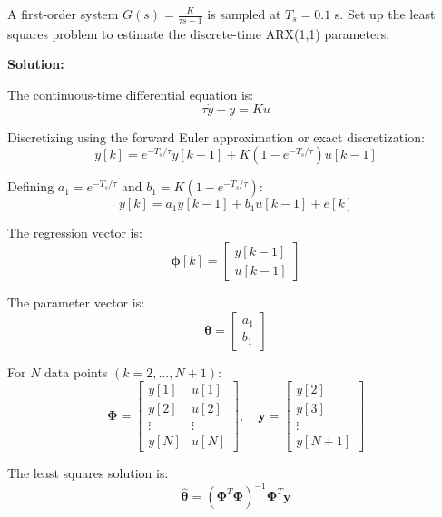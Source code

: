 \begin{examplebox}
A first-order system $G(s) = \frac{K}{\tau s + 1}$ is sampled at $T_s = 0.1$ s. Set up the least squares problem to estimate the discrete-time ARX(1,1) parameters.

\textbf{Solution:}

The continuous-time differential equation is:
\begin{equation*}
\tau \dot{y} + y = Ku
\end{equation*}

Discretizing using the forward Euler approximation or exact discretization:
\begin{equation*}
y[k] = e^{-T_s/\tau} y[k-1] + K(1 - e^{-T_s/\tau}) u[k-1]
\end{equation*}

Defining $a_1 = e^{-T_s/\tau}$ and $b_1 = K(1 - e^{-T_s/\tau})$:
\begin{equation*}
y[k] = a_1 y[k-1] + b_1 u[k-1] + e[k]
\end{equation*}

The regression vector is:
\begin{equation*}
\boldsymbol{\phi}[k] = \begin{bmatrix} y[k-1] \\ u[k-1] \end{bmatrix}
\end{equation*}

The parameter vector is:
\begin{equation*}
\boldsymbol{\theta} = \begin{bmatrix} a_1 \\ b_1 \end{bmatrix}
\end{equation*}

For $N$ data points $(k = 2, \ldots, N+1)$:
\begin{equation*}
\boldsymbol{\Phi} = \begin{bmatrix}
y[1] & u[1] \\
y[2] & u[2] \\
\vdots & \vdots \\
y[N] & u[N]
\end{bmatrix}, \quad
\mathbf{y} = \begin{bmatrix}
y[2] \\
y[3] \\
\vdots \\
y[N+1]
\end{bmatrix}
\end{equation*}

The least squares solution is:
\begin{equation*}
\boxed{\hat{\boldsymbol{\theta}} = (\boldsymbol{\Phi}^T \boldsymbol{\Phi})^{-1} \boldsymbol{\Phi}^T \mathbf{y}}
\end{equation*}
\end{examplebox}


